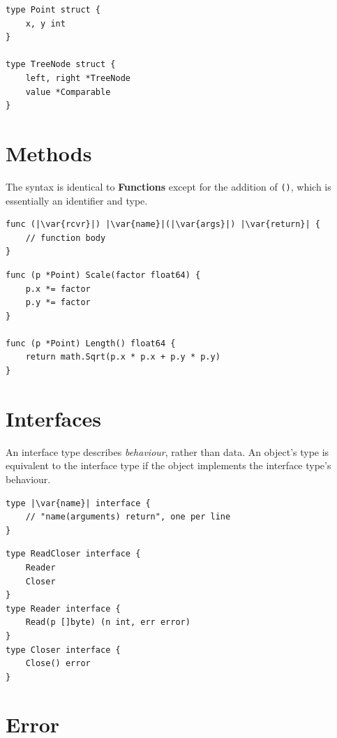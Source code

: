 \documentclass{article}
\newcommand{\var}[1]{\texttt{\textit{\underbar{#1}}}}
\begin{document}
\begin{multicols*}{3}
  \vspace{\baselineskip}
\begin{lstlisting}[frame=single]
type Point struct {
    x, y int
}

type TreeNode struct {
    left, right *TreeNode
    value *Comparable
}
\end{lstlisting}

  \filbreak
  \section*{Methods}

  The syntax is identical to {\color{macewan}\bfseries{}Functions} except for the addition of \texttt{(\var{rcvr})}, which is essentially an identifier and type.

\begin{lstlisting}[escapechar=|]
func (|\var{rcvr}|) |\var{name}|(|\var{args}|) |\var{return}| {
    // function body
}
\end{lstlisting}

\begin{lstlisting}[frame=single,escapechar=|]
func (p *Point) Scale(factor float64) {
    p.x *= factor
    p.y *= factor
}

func (p *Point) Length() float64 {
    return math.Sqrt(p.x * p.x + p.y * p.y)
}
\end{lstlisting}

  \filbreak
  \section*{Interfaces}

  An interface type describes \textit{behaviour}, rather than data.
  An object's type is equivalent to the interface type if the object implements the interface type's behaviour.

\begin{lstlisting}[escapechar=|]
type |\var{name}| interface {
    // "name(arguments) return", one per line
}
\end{lstlisting}

\begin{lstlisting}[escapechar=|]
type ReadCloser interface {
    Reader
    Closer
}
type Reader interface {
    Read(p []byte) (n int, err error)
}
type Closer interface {
    Close() error
}
\end{lstlisting}

  \filbreak
  \section*{Error}


\end{multicols*}
\end{document}
